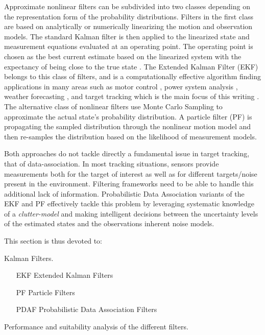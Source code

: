 Approximate nonlinear filters can be subdivided into two classes depending on the representation form of the probability distributions. Filters in the first class are based on analytically or numerically linearizing the motion and observation models. The standard Kalman filter is then applied to the linearized state and measurement equations evaluated at an operating point. The operating point is chosen as the best current estimate based on the linearized system with the expectancy of being close to the true state \cite{Shalom2001}. The Extended Kalman Filter (EKF) belongs to this class of filters, and is a computationally effective algorithm finding applications in many areas such as motor control \cite{Terzic2001}, power system analysis \cite{Khazraj2016}, weather forecasting \cite{Rosnay2012}, and target tracking which is the main focus of this writing \cite{Shalom1995}. The alternative class of nonlinear filters use Monte Carlo Sampling to approximate the actual state's probability distribution.  A particle filter (PF) is propagating the sampled distribution through the nonlinear motion model and then re-samples the distribution based on the likelihood of measurement models. 

Both approaches do not tackle directly a fundamental issue in target tracking, that of data-association. In most tracking situations, sensors provide measurements both for the target of interest as well as for different targets/noise present in the environment. Filtering frameworks need to be able to handle this additional lack of information. Probabilistic Data Association \cite{Ristic2004} variants of the EKF and PF effectively tackle this problem by leveraging systematic knowledge of a \emph{clutter-model} and making intelligent decisions between the uncertainty levels of the estimated states and the observations inherent noise models.

This section is thus devoted to:

\begin{description}[style=nextline]
	\item[Linear filters] Kalman Filters.
	\item [Non-linear filters]
	\begin{itemize}
		\item[]
		\item[EKF] Extended Kalman Filters
		\item[PF]Particle Filters
		\item[PDAF] Probabilistic Data Association Filters 
	\end{itemize}
	\item[Comparison]Performance and suitability analysis of the different filters. 
\end{description}


